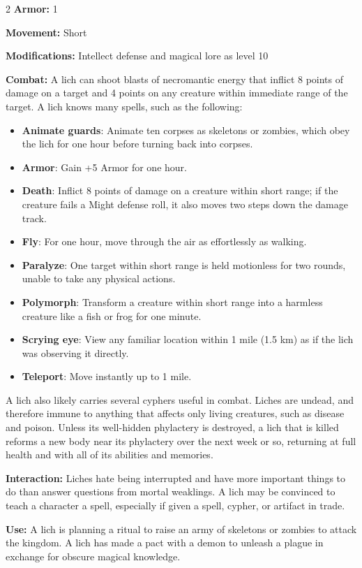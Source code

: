 \begin{multicols}{2}
\textbf{Armor:} 1 

\textbf{Movement:} Short 

\textbf{Modifications:} Intellect defense and magical lore as level 10 

\textbf{Combat:} A lich can shoot blasts of necromantic energy that inflict 8 points of damage on a target and 4 points on any creature within immediate range of the target. A lich knows many spells, such as the following:

\begin{itemize}
\item \textbf{Animate guards}: Animate ten corpses as skeletons or zombies, which obey the lich for one hour before turning back into corpses.
\item \textbf{Armor}: Gain +5 Armor for one hour. 
\item \textbf{Death}: Inflict 8 points of damage on a creature within short range; if the creature fails a Might defense roll, it also moves two steps down the damage track. 
\item \textbf{Fly}: For one hour, move through the air as effortlessly as walking. 
\item \textbf{Paralyze}: One target within short range is held motionless for two rounds, unable to take any physical actions. 
\item \textbf{Polymorph}: Transform a creature within short range into a harmless creature like a fish or frog for one minute. 
\item \textbf{Scrying eye}: View any familiar location within 1 mile (1.5 km) as if the lich was observing it directly. 
\item \textbf{Teleport}: Move instantly up to 1 mile.
\end{itemize}

A lich also likely carries several cyphers useful in combat. Liches are undead, and therefore immune to anything that affects only living creatures, such as disease and poison. Unless its well-hidden phylactery is destroyed, a lich that is killed reforms a new body near its phylactery over the next week or so, returning at full health and with all of its abilities and memories. 

\textbf{Interaction:} Liches hate being interrupted and have more important things to do than answer questions from mortal weaklings. A lich may be convinced to teach a character a spell, especially if given a spell, cypher, or artifact in trade. 

\textbf{Use:} A lich is planning a ritual to raise an army of skeletons or zombies to attack the kingdom. A lich has made a pact with a demon to unleash a plague in exchange for obscure magical knowledge. 


\end{multicols}
